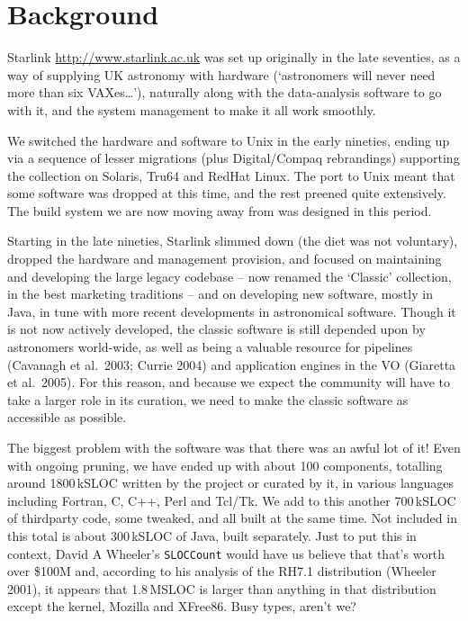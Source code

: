 \documentclass{speauth}
\begin{document}
\section{Background}
\label{s:background}


Starlink \url{http://www.starlink.ac.uk} was set up
originally in the late seventies, as a way of supplying UK astronomy
with hardware (`astronomers will never need more than six
VAXes\dots'), naturally along with the data-analysis software to go
with it, and the system management to make it all work smoothly.

We switched the hardware and software to Unix in the early nineties,
ending up via a sequence of lesser migrations (plus Digital/Compaq
rebrandings) supporting the collection on Solaris, Tru64 and RedHat
Linux.  The port to Unix meant that some software was dropped at this
time, and the rest preened quite extensively.  The build system we are
now moving away from was designed in this period.

Starting in the late nineties, Starlink slimmed down (the diet was not
voluntary), dropped the hardware and management provision, and focused
on maintaining and developing the large legacy codebase -- now renamed
the `Classic' collection, in the best marketing traditions -- and on
developing new software, mostly in Java, in tune with more recent
developments in astronomical software.  Though it is not now actively
developed, the classic software is still depended upon by astronomers
world-wide, as well as being a valuable resource for pipelines
(Cavanagh et al.\ 2003; Currie 2004) and application engines in the VO
(Giaretta et al.\ 2005).
For this reason, and because we expect the community will have to take
a larger role in its curation, we need to make the classic software as
accessible as possible.

The biggest problem with the software was that there was an awful lot
of it!  Even with ongoing pruning, we have ended up with about 100
components, totalling around 1800\,kSLOC written by the project or
curated by it, in various languages
including Fortran, C, C++, Perl and Tcl/Tk.  We add to this another
700\,kSLOC of thirdparty code, some tweaked, and all built at the same
time.  Not included in this total is about 300\,kSLOC of Java,
built separately.  Just to put this in context, David A
Wheeler's \texttt{SLOCCount} would have us believe that that's worth
over \$100M and, according to his analysis of the RH7.1 distribution
(Wheeler 2001), it appears that 1.8\,MSLOC is larger than anything in
that distribution except the kernel, Mozilla and XFree86.  Busy types,
aren't we?
\end{document}
